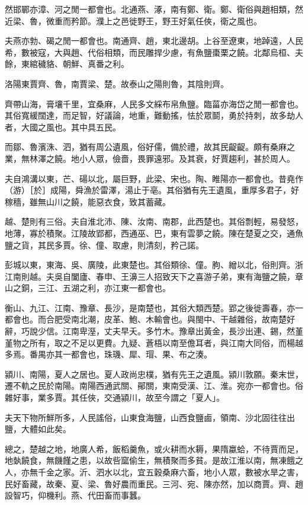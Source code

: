 \begin{pinyinscope}
然邯鄲亦漳、河之閒一都會也。北通燕、涿，南有鄭、衛。鄭、衛俗與趙相類，然近梁、魯，微重而矜節。濮上之邑徙野王，野王好氣任俠，衛之風也。

夫燕亦勃、碣之閒一都會也。南通齊、趙，東北邊胡。上谷至遼東，地踔遠，人民希，數被寇，大與趙、代俗相類，而民雕捍少慮，有魚鹽棗栗之饒。北鄰烏桓、夫餘，東綰穢貉、朝鮮、真番之利。

洛陽東賈齊、魯，南賈梁、楚。故泰山之陽則魯，其陰則齊。

齊帶山海，膏壤千里，宜桑麻，人民多文綵布帛魚鹽。臨菑亦海岱之閒一都會也。其俗寬緩闊達，而足智，好議論，地重，難動搖，怯於眾鬬，勇於持刺，故多劫人者，大國之風也。其中具五民。

而鄒、魯濱洙、泗，猶有周公遺風，俗好儒，備於禮，故其民齪齪。頗有桑麻之業，無林澤之饒。地小人眾，儉嗇，畏罪遠邪。及其衰，好賈趨利，甚於周人。

夫自鴻溝以東，芒、碭以北，屬巨野，此梁、宋也。陶、睢陽亦一都會也。昔堯作（游）［於］成陽，舜漁於雷澤，湯止于亳。其俗猶有先王遺風，重厚多君子，好稼穡，雖無山川之饒，能惡衣食，致其蓄藏。

越、楚則有三俗。夫自淮北沛、陳、汝南、南郡，此西楚也。其俗剽輕，易發怒，地薄，寡於積聚。江陵故郢都，西通巫、巴，東有雲夢之饒。陳在楚夏之交，通魚鹽之貨，其民多賈。徐、僮、取慮，則清刻，矜己諾。

彭城以東，東海、吳、廣陵，此東楚也。其俗類徐、僮。朐、繒以北，俗則齊。浙江南則越。夫吳自闔廬、春申、王濞三人招致天下之喜游子弟，東有海鹽之饒，章山之銅，三江、五湖之利，亦江東一都會也。

衡山、九江、江南、豫章、長沙，是南楚也，其俗大類西楚。郢之後徙壽春，亦一都會也。而合肥受南北潮，皮革、鮑、木輸會也。與閩中、干越雜俗，故南楚好辭，巧說少信。江南卑溼，丈夫早夭。多竹木。豫章出黃金，長沙出連、錫，然堇堇物之所有，取之不足以更費。九疑、蒼梧以南至儋耳者，與江南大同俗，而楊越多焉。番禺亦其一都會也，珠璣、犀、瑁、果、布之湊。

潁川、南陽，夏人之居也。夏人政尚忠樸，猶有先王之遺風。潁川敦願。秦末世，遷不軌之民於南陽。南陽西通武關、鄖關，東南受漢、江、淮。宛亦一都會也。俗雜好事，業多賈。其任俠，交通潁川，故至今謂之「夏人」。

夫天下物所鮮所多，人民謠俗，山東食海鹽，山西食鹽鹵，領南、沙北固往往出鹽，大體如此矣。

總之，楚越之地，地廣人希，飯稻羹魚，或火耕而水耨，果隋蠃蛤，不待賈而足，地埶饒食，無饑饉之患，以故呰窳偷生，無積聚而多貧。是故江淮以南，無凍餓之人，亦無千金之家。沂、泗水以北，宜五穀桑麻六畜，地小人眾，數被水旱之害，民好畜藏，故秦、夏、梁、魯好農而重民。三河、宛、陳亦然，加以商賈。齊、趙設智巧，仰機利。燕、代田畜而事蠶。


\end{pinyinscope}
